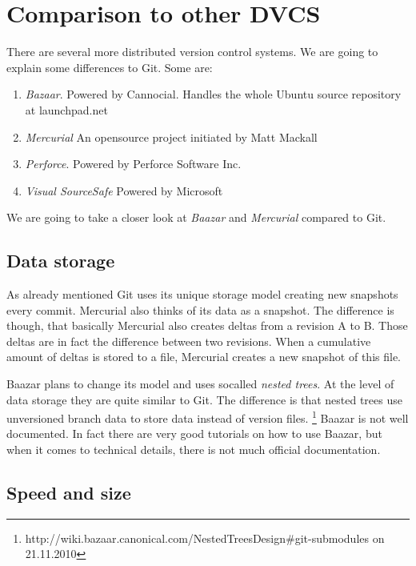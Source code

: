 \section {Comparison to other DVCS}\label{comparisontootherdvcs}

There are several more distributed version control systems.
We are going to explain some differences to Git.
Some are:

  \begin{enumerate}
     \item \emph{Bazaar}. Powered by Cannocial. Handles the whole Ubuntu source
     repository at launchpad.net
     \item \emph{Mercurial} An opensource project initiated by Matt Mackall
     \item \emph{Perforce}. Powered by Perforce Software Inc.
     \item \emph{Visual SourceSafe} Powered by Microsoft
  \end{enumerate}
  
We are going to take a closer look at \emph{Baazar} and \emph{Mercurial} 
compared to Git.

\subsection {Data storage}

As already mentioned Git uses its unique storage model creating new snapshots
every commit. Mercurial also thinks of its data as a snapshot. The difference
is though, that basically Mercurial also creates deltas from a revision A to B.
Those deltas are in fact the difference between two revisions. When a cumulative
amount of deltas is stored to a file, Mercurial creates a new snapshot of this file. 
\cite[chapter 4]{hgbook2009} 

Baazar plans to change its model and uses socalled \emph{nested trees}. At the level of data storage they are quite similar to Git. The difference is that nested trees use unversioned branch data to store data instead of version files. \footnote{ http://wiki.bazaar.canonical.com/NestedTreesDesign\#git-submodules on 21.11.2010 } Baazar is not well documented. In fact there are very good tutorials on how to use Baazar, but when it comes to technical details, there is not much official documentation.

\subsection {Speed and size}


